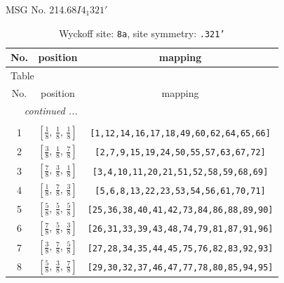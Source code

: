 \documentclass[fleqn,8pt]{jsarticle}
\begin{document}
\setcounter{MaxMatrixCols}{32}

\renewcommand{\tablename}{Table~}
\renewcommand{\figurename}{Figure~}
\begin{center}
\LARGE
MSG No. 214.68\quad$I4_{1}321'$
\end{center}
\renewcommand{\arraystretch}{1.2}
\begin{longtable}{ccc}
\caption{Wyckoff site: {\tt 8a}, site symmetry: {\tt .321'}}
 \\
 \hline \hline
No. & position & mapping \\ \hline \endfirsthead

\multicolumn{2}{l}{\tablename\ \thetable{}} \\
 \hline \hline
No. & position & mapping \\ \hline \endhead

 \hline \hline
\multicolumn{2}{r}{\footnotesize\it continued ...} \\ \endfoot

 \hline \hline
\multicolumn{2}{r}{} \\ \endlastfoot

1 & $\left[ \frac{1}{8},\, \frac{1}{8},\, \frac{1}{8} \right]$ & {\tt [1,12,14,16,17,18,49,60,62,64,65,66]} \\ \hline
2 & $\left[ \frac{3}{8},\, \frac{1}{8},\, \frac{7}{8} \right]$ & {\tt [2,7,9,15,19,24,50,55,57,63,67,72]} \\ \hline
3 & $\left[ \frac{7}{8},\, \frac{3}{8},\, \frac{1}{8} \right]$ & {\tt [3,4,10,11,20,21,51,52,58,59,68,69]} \\ \hline
4 & $\left[ \frac{1}{8},\, \frac{7}{8},\, \frac{3}{8} \right]$ & {\tt [5,6,8,13,22,23,53,54,56,61,70,71]} \\ \hline
5 & $\left[ \frac{5}{8},\, \frac{5}{8},\, \frac{5}{8} \right]$ & {\tt [25,36,38,40,41,42,73,84,86,88,89,90]} \\ \hline
6 & $\left[ \frac{7}{8},\, \frac{5}{8},\, \frac{3}{8} \right]$ & {\tt [26,31,33,39,43,48,74,79,81,87,91,96]} \\ \hline
7 & $\left[ \frac{3}{8},\, \frac{7}{8},\, \frac{5}{8} \right]$ & {\tt [27,28,34,35,44,45,75,76,82,83,92,93]} \\ \hline
8 & $\left[ \frac{5}{8},\, \frac{3}{8},\, \frac{7}{8} \right]$ & {\tt [29,30,32,37,46,47,77,78,80,85,94,95]} \\
\end{longtable}
\renewcommand{\arraystretch}{1.2}
\end{document}
